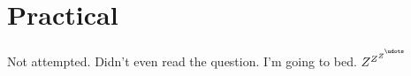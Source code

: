 \documentclass[a4paper]{article}
\begin{document}
\begin{enumerate}
	\end{enumerate}
	
	\section*{Practical}
	Not attempted. Didn't even read the question. I'm going to bed. $Z^{Z^{Z^{\null^\udots}}}$
\end{document}
